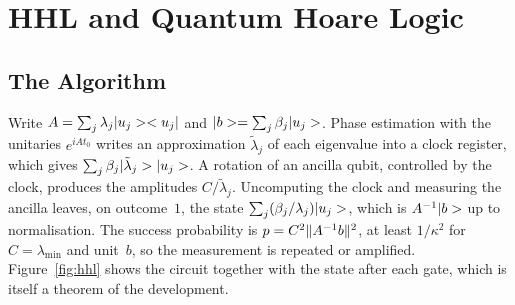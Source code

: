 \section{HHL and Quantum Hoare Logic}\label{sec:hhl}

\subsection{The Algorithm}

Write $A=\sum_j\lambda_j|u_j>< u_j|$ and $|b>=\sum_j\beta_j|u_j>$. Phase estimation with
the unitaries $e^{iAt_0}$ writes an approximation $\tilde\lambda_j$ of each eigenvalue into a clock
register, which gives $\sum_j\beta_j|\tilde\lambda_j>|u_j>$. A rotation of an ancilla qubit,
controlled by the clock, produces the amplitudes $C/\tilde\lambda_j$. Uncomputing the clock and
measuring the ancilla leaves, on outcome~$1$, the state $\sum_j(\beta_j/\lambda_j)|u_j>$, which is
$A^{-1}|b>$ up to normalisation. The success probability is $p=C^2\|A^{-1}b\|^2$, at least
$1/\kappa^2$ for $C=\lambda_{\min}$ and unit~$b$, so the measurement is repeated or amplified.
Figure~\ref{fig:hhl} shows the circuit together with the state after each gate, which is itself a
theorem of the development.

